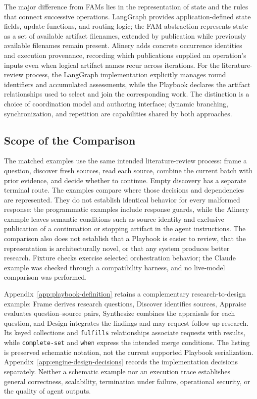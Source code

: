 \documentclass[letterpaper]{article}
\theoremstyle{definition}
\begin{document}
The major difference from FAMs lies in the representation of state and the
rules that connect successive operations. LangGraph provides
application-defined state fields, update functions, and routing logic; the
FAM abstraction represents state as a set of available artifact filenames,
extended by publication while previously available filenames remain present.
Alinery adds concrete occurrence identities and execution provenance,
recording which publications supplied an operation's inputs even when logical
artifact names recur across iterations. For the literature-review process,
the LangGraph implementation explicitly manages round identifiers and
accumulated assessments, while the Playbook declares the artifact
relationships used to select and join the corresponding work. The distinction
is a choice of coordination model and authoring interface; dynamic branching,
synchronization, and repetition are capabilities shared by both approaches.

\subsection{Scope of the Comparison}

The matched examples use the same intended literature-review process:
frame a question, discover fresh sources, read each source, combine the
current batch with prior evidence, and decide whether to continue. Empty
discovery has a separate terminal route. The examples compare where those
decisions and dependencies are represented. They do not establish identical
behavior for every malformed response: the programmatic examples include
response guards, while the Alinery example leaves semantic conditions such as
source identity and exclusive publication of a continuation or stopping
artifact in the agent instructions. The comparison also does not establish
that a Playbook is easier to review, that the representation is architecturally
novel, or that any system produces better research. Fixture checks exercise
selected orchestration behavior; the Claude example was checked through a
compatibility harness, and no live-model comparison was performed.

Appendix~\ref{app:playbook-definition} retains a complementary
research-to-design example: Frame derives research questions, Discover
identifies sources, Appraise evaluates question--source pairs, Synthesize
combines the appraisals for each question, and Design integrates the findings
and may request follow-up research. Its keyed collections and
\texttt{fulfills} relationships associate requests with results, while
\texttt{complete-set} and \texttt{when} express the intended merge conditions.
The listing is preserved schematic notation, not the current supported
Playbook serialization. Appendix~\ref{app:engine-design-decisions} records the
implementation decisions separately. Neither a schematic example nor an
execution trace establishes general correctness, scalability, termination
under failure, operational security, or the quality of agent outputs.
\end{document}
